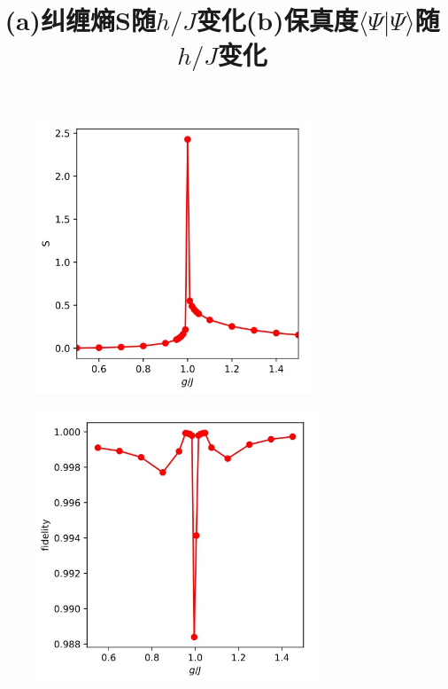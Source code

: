 \documentclass[12pt]{article}
\begin{document}
       \begin{figure}[H]
      	\centering
      	\begin{minipage}{0.49\linewidth}
      		\centering
      		\includegraphics[width=1\linewidth, height=230pt]{tfi_tran1}
      		\title{(a)纠缠熵S随$h/J$变化}
      		\label{fig:29}
      	\end{minipage}
      	\begin{minipage}{0.49\linewidth}
      		\centering
      		\includegraphics[width=1\linewidth, height=230pt]{tfi_tran2}
      		\title{(b)保真度$\langle\Psi|\Psi\rangle$随$h/J$变化}
      		\label{fig:30}
      	\end{minipage}
      

\end{figure}
\end{document}

